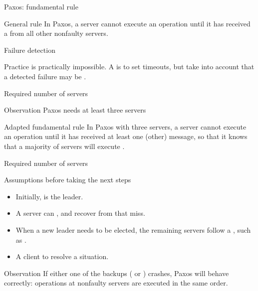 \begin{slide}{Paxos: fundamental rule}
  \begin{alertblock}{General rule}
      In Paxos, a server  cannot execute an operation  until it has received a
       from all other nonfaulty servers.
  \end{alertblock}
\end{slide}
\begin{slide}{Failure detection}
  \begin{block}{Practice}
     is practically impossible. A  is to set timeouts, but take
    into account that a detected failure may be . 
  \end{block}
  \begin{center}
  \end{center}
\end{slide}
\begin{slide}{Required number of servers}
  \begin{alertblock}{Observation}
    Paxos needs at least three servers
  \end{alertblock}
  \begin{alertblock}{Adapted fundamental rule}
    In Paxos with three servers, a server  cannot execute an operation  until it has received at
    least one (other)  message, so that it knows that a majority of servers will
    execute .
  \end{alertblock}
\end{slide}
\begin{slide}{Required number of servers}
  \begin{block}{Assumptions before taking the next steps}
    \begin{itemize}\tightlist
    \item Initially,  is the leader. 
    \item A server can , and recover from that miss.
    \item When a new leader needs to be elected, the remaining servers follow a , such as  \mathexpr{\rightarrow}  \mathexpr{\rightarrow} .
    \item A client  to resolve a situation.
    \end{itemize}
  \end{block}
  \begin{alertblock}{Observation}
    If either one of the backups ( or ) crashes, Paxos will behave correctly: operations at
      nonfaulty servers are executed in the same order.
  \end{alertblock}
\end{slide}
